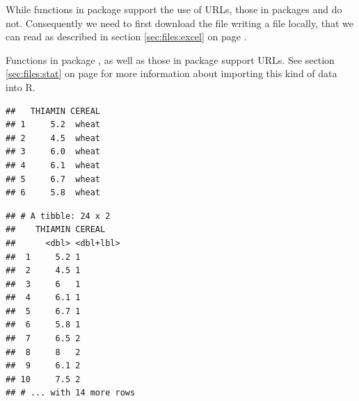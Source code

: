 \documentclass[krantz2]{krantz}\usepackage{knitr}%
\begin{document}
While functions in package  support the use of URLs, those in packages  and  do not. Consequently we need to first download the file writing a file locally, that we can read as described in section \ref{sec:files:excel} on page \pageref{sec:files:excel}.

\begin{knitrout}\footnotesize
{}\color{fgcolor}\begin{kframe}
\begin{alltt}
\hlstd{(}\hlstd{,}
              \hlstd{,}
               \hlstd{=} \hlstd{)}
\end{alltt}
\end{kframe}
\end{knitrout}

Functions in package , as well as those in package  support URLs. See section \ref{sec:files:stat} on page \pageref{sec:files:stat} for more information about importing this kind of data into R.

\begin{knitrout}\footnotesize
{}\color{fgcolor}\begin{kframe}
\begin{alltt}
 \hlkwb{<-}
  \hlstd{(} \hlstd{=} \hlstd{,}
             \hlstd{=} \hlstd{)}
\end{alltt}
\begin{verbatim}
##   THIAMIN CEREAL
## 1     5.2  wheat
## 2     4.5  wheat
## 3     6.0  wheat
## 4     6.1  wheat
## 5     6.7  wheat
## 6     5.8  wheat
\end{verbatim}
\end{kframe}
\end{knitrout}

\begin{knitrout}\footnotesize
{}\color{fgcolor}\begin{kframe}
\begin{alltt}
 \hlkwb{<-}
    \hlstd{(} \hlstd{=} \hlstd{)}
\end{alltt}
\begin{verbatim}
## # A tibble: 24 x 2
##    THIAMIN CEREAL   
##      <dbl> <dbl+lbl>
##  1     5.2 1        
##  2     4.5 1        
##  3     6   1        
##  4     6.1 1        
##  5     6.7 1        
##  6     5.8 1        
##  7     6.5 2        
##  8     8   2        
##  9     6.1 2        
## 10     7.5 2        
## # ... with 14 more rows
\end{verbatim}
\end{kframe}
\end{knitrout}
\end{document}
